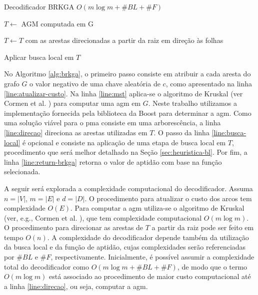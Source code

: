 \begin{algorithm}[!ht]
  \caption{Decodificador BRKGA $O(m \log m + \#BL + \#F)$ \label{alg:brkga}}


  $T \leftarrow$ AGM computada em G\; \label{line:mst}

  $T \leftarrow T$ com as arestas direcionadas a partir da raiz em direção às folhas\; \label{line:direcao}

  Aplicar busca local em $T$\; \label{line:busca-local}

  \; \label{line:return-brkga}
\end{algorithm}

No  Algoritmo \ref{alg:brkga},  o primeiro  passo  consiste em  atribuir a  cada
aresta  do grafo  $G$ o  valor  negativo de  uma  chave aleatória  de $c$,  como
apresentado  na linha  \eqref{line:atualizar-custo}.  Na linha  \eqref{line:mst}
aplica-se o  algoritmo de  Kruskal (ver Cormen  et al.  \cite{cormen:2009}) para
computar  uma  \gls{agm}  em  $G$. Neste  trabalho  utilizamos  a  implementação
fornecida pela biblioteca da Boost para determinar a \gls{agm}. Como uma solução
viável   para   o   \gls{pma}   consiste   em   uma   arborescência,   a   linha
\eqref{line:direcao} direciona  as arestas utilizadas  em $T$. O passo  da linha
\eqref{line:busca-local}  é opcional  e consiste  na aplicação  de uma  etapa de
busca  local   em  $T$,  procedimento   que  será  melhor  detalhado   na  Seção
\ref{sec:heuristica-bl}. Por  fim, a  linha \eqref{line:return-brkga}  retorna o
valor de aptidão com base na função selecionada.

A seguir será explorada a complexidade computacional do decodificador. Assuma $n
= |V|$, $m =  |E|$ e $d = |D|$. O procedimento para  atualizar o custo dos arcos
tem complexidade  $O(E)$. Para  computar a \gls{agm}  utiliza-se o  algoritmo de
Kruskal  (ver, e.g.,  Cormen et  al. \cite{cormen:2009}),  que tem  complexidade
computacional $O(m \log m)$. O procedimento  para direcionar as arestas de $T$ a
partir da raiz  pode ser feito em tempo $O(n)$.  A complexidade do decodificador
depende  também da  utilização da  busca  local e  da função  de aptidão,  cujas
complexidades  serão   referenciadas  por   $\#BL$  e   $\#F$,  respectivamente.
Inicialmente, é possível assumir a complexidade total do decodificador como $O(m
\log m  + \#BL  + \#F)$, de  modo que o  termo $O(m  \log m)$ está  associado ao
procedimento de maior  custo computacional até a  linha \eqref{line:direcao}, ou
seja, computar a \gls{agm}.

